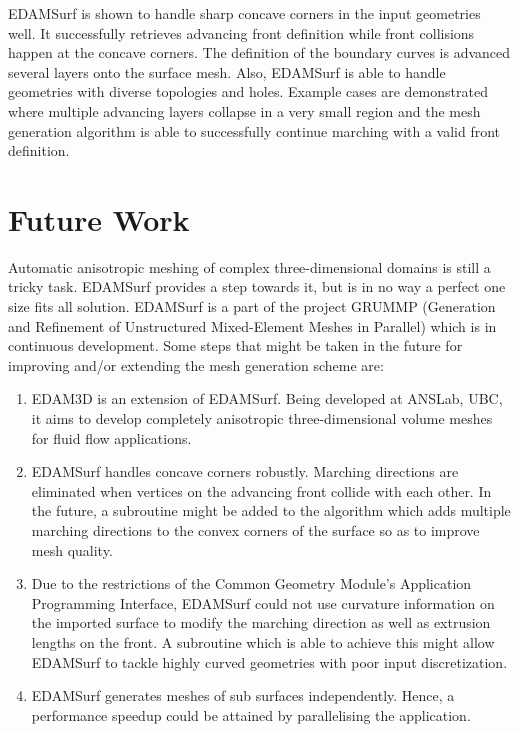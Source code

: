 EDAMSurf is shown to handle sharp concave corners in the input geometries well. It successfully retrieves advancing front definition while front collisions happen at the concave corners. The definition of the boundary curves is advanced several layers onto the surface mesh. Also, EDAMSurf is able to handle geometries with diverse topologies and holes. Example cases are demonstrated where multiple advancing layers collapse in a very small region and the mesh generation algorithm is able to successfully continue marching with a valid front definition.

\section{Future Work}

Automatic anisotropic meshing of complex three-dimensional domains is still a tricky task. EDAMSurf provides a step towards it, but is in no way a perfect one size fits all solution. EDAMSurf is a part of the project GRUMMP (Generation and Refinement of Unstructured Mixed-Element Meshes in Parallel)\cite{ollivier2010grummp} which is in continuous development. Some steps that might be taken in the future for improving and/or extending the mesh generation scheme are:

\begin{enumerate}
	\item EDAM3D is an extension of EDAMSurf. Being developed at ANSLab, UBC, it aims to develop completely anisotropic three-dimensional volume meshes for fluid flow applications.
	\item EDAMSurf handles concave corners robustly. Marching directions are eliminated when vertices on the advancing front collide with each other. In the future, a subroutine might be added to the algorithm which adds multiple marching directions to the convex corners of the surface so as to improve mesh quality.
	\item Due to the restrictions of the Common Geometry Module's Application Programming Interface, EDAMSurf could not use curvature information on the imported surface to modify the marching direction as well as extrusion lengths on the front. A subroutine which is able to achieve this might allow EDAMSurf to tackle highly curved geometries with poor input discretization.
	\item EDAMSurf generates meshes of sub surfaces independently. Hence, a performance speedup could be attained by parallelising the application.
\end{enumerate}








